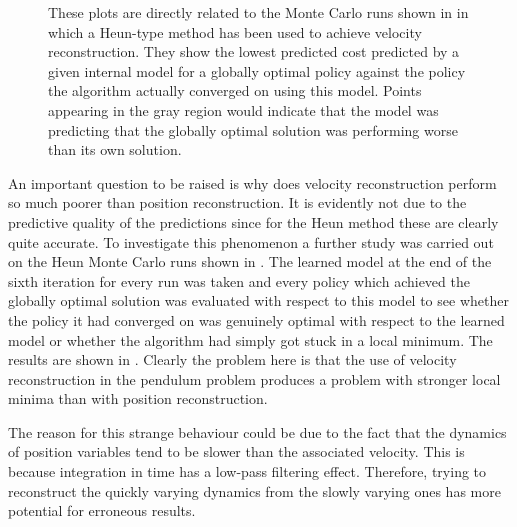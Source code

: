 \begin{figure}
\caption{These plots are directly related to the Monte Carlo runs shown in  in which a Heun-type method has been used to achieve velocity reconstruction. They show the lowest predicted cost predicted by a given internal model for a globally optimal policy against the policy the algorithm actually converged on using this model. Points appearing in the gray region would indicate that the model was predicting that the globally optimal solution was performing worse than its own solution.}
\label{fig:penpred}
\end{figure}



An important question to be raised is why does velocity reconstruction perform so much poorer than position reconstruction. It is evidently not due to the predictive quality of the predictions since for the Heun method these are clearly quite accurate. To investigate this phenomenon a further study was carried out on the Heun Monte Carlo runs shown in . The learned model at the end of the sixth iteration for every run was taken and every policy which achieved the globally optimal solution was evaluated with respect to this model to see whether the policy it had converged on was genuinely optimal with respect to the learned model or whether the algorithm had simply got stuck in a local minimum. The results are shown in . Clearly the problem here is that the use of velocity reconstruction in the pendulum problem produces a problem with stronger local minima than with position reconstruction.

The reason for this strange behaviour could be due to the fact that the dynamics of position variables tend to be slower than the associated velocity. This is because integration in time has a low-pass filtering effect. Therefore, trying to reconstruct the quickly varying dynamics from the slowly varying ones has more potential for erroneous results. 



